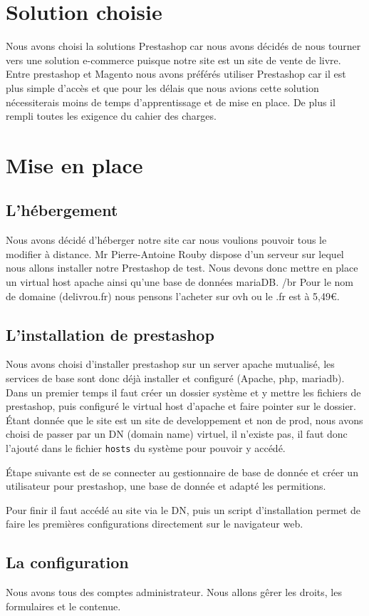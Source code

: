 \documentclass[a4paper,12pt]{report}
\begin{document}
\chapter{Solution choisie}
Nous avons choisi la solutions Prestashop car nous avons décidés de
nous tourner vers une solution e-commerce puisque notre site est un
site de vente de livre.  Entre prestashop et Magento nous avons
préférés utiliser Prestashop car il est plus simple d'accès et que
pour les délais que nous avions cette solution nécessiterais moins de
temps d'apprentissage et de mise en place. De plus il rempli toutes
les exigence du cahier des charges.

\chapter{Mise en place}
\section{L'hébergement}
Nous avons décidé d’héberger notre site car nous voulions pouvoir tous
le modifier à distance. Mr Pierre-Antoine Rouby dispose d'un serveur
sur lequel nous allons installer notre Prestashop de test. Nous devons
donc mettre en place un virtual host apache ainsi qu'une base de données
mariaDB. /br
Pour le nom de domaine (delivrou.fr) nous pensons l'acheter sur ovh ou
le .fr est à 5,49€.

\section{L'installation de prestashop}
Nous avons choisi d'installer prestashop sur un server apache mutualisé,
les services de base sont donc déjà installer et configuré (Apache, php,
mariadb).
Dans un premier temps il faut créer un dossier système et y mettre les
fichiers de prestashop, puis configuré le virtual host d'apache et faire
pointer sur le dossier. Étant donnée que le site est un site de
developpement et non de prod, nous avons choisi de passer par un DN (domain
name) virtuel, il n'existe pas, il faut donc l'ajouté dans le fichier
\texttt{hosts} du système pour pouvoir y accédé.

Étape suivante est de se connecter au gestionnaire de base de donnée et créer
un utilisateur pour prestashop, une base de donnée et adapté les permitions.

Pour finir il faut accédé au site via le DN, puis un script d'installation
permet de faire les premières configurations directement sur le navigateur
web.

\section{La configuration}
Nous avons tous des comptes administrateur.
Nous allons gêrer les droits, les formulaires et le contenue.
\end{document}
